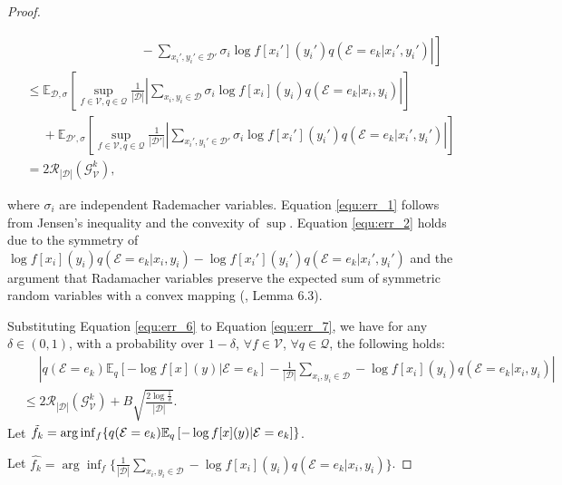 \begin{proof}
\begin{small}
\begin{align}
    \label{equ:err_2}
    &\left.\left.\quad\quad\quad\quad\quad\quad\quad\quad\quad - \sum_{x_i',y_i' \in \mathcal D'} \sigma_i \log f[x_i'](y_i') q(\mathcal E=e_k|x_i',y_i') \right| \right] \\
    &\leq \mathbb E_{\mathcal D, \sigma} \left[ \sup_{f\in \mathcal V, q \in \mathcal Q} \frac{1}{|\mathcal D|} \left| \sum_{x_i,y_i \in \mathcal D} \sigma_i \log f[x_i](y_i) q(\mathcal E=e_k|x_i,y_i) \right| \right] \\
    &\quad\; + \mathbb E_{\mathcal D', \sigma} \left[ \sup_{f\in \mathcal V, q \in \mathcal Q} \frac{1}{|\mathcal D'|} \left| \sum_{x_i',y_i' \in \mathcal D'} \sigma_i \log f[x_i'](y_i') q(\mathcal E=e_k|x_i',y_i') \right| \right] \\
    \label{equ:err_6}
    &= 2\mathscr R_{|\mathcal D|}(\mathcal G_{\mathcal V}^k),
\end{align}
\end{small}
where $\sigma_i$ are independent Rademacher variables. Equation \ref{equ:err_1} follows from Jensen's inequality and the convexity of $\sup$. Equation \ref{equ:err_2} holds due to the symmetry of $\log f[x_i](y_i) q(\mathcal E=e_k|x_i,y_i) - \log f[x_i'](y_i') q(\mathcal E=e_k|x_i',y_i')$ and the argument that Radamacher variables preserve the expected sum of symmetric random variables with a convex mapping (\cite{banach_probability}, Lemma 6.3).

Substituting Equation \ref{equ:err_6} to Equation \ref{equ:err_7}, we have for any $\delta \in (0,1)$, with a probability over $1 - \delta$, $\forall f \in \mathcal V$, $\forall q \in \mathcal Q$, the following holds:
\begin{align}
\label{equ:err_3}
    &\quad\; \left| q(\mathcal E=e_k)\mathbb E_{q} \left[ -\log f[x](y)|\mathcal E=e_k \right]  - \frac{1}{|\mathcal D|} \sum_{x_i,y_i \in \mathcal D} -\log f[x_i](y_i) q(\mathcal E=e_k|x_i,y_i)   \right|\\
    &\leq 2\mathscr R_{|\mathcal D|}(\mathcal G_{\mathcal V}^k) + B\sqrt{\frac{2\log{\frac{1}{\delta}}}{|\mathcal D|}}.
\end{align}
Let $\Tilde{f_k} = \arg \inf_f \{q(\mathcal E=e_k)\mathbb E_{q} \left[ -\log f[x](y)|\mathcal E=e_k \right]\}$. 

Let $\hat{f_k} = \arg \inf_f \{\frac{1}{|\mathcal D|} \sum_{x_i,y_i \in \mathcal D} -\log f[x_i](y_i)  q(\mathcal E=e_k|x_i,y_i)\}$.


\end{proof}
